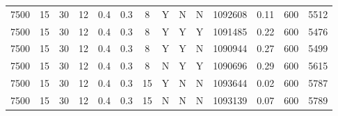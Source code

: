 \documentclass[a4paper, twocolumn, oneside, 10pt]{article}
\begin{document}
\begin{longtable}{|ccccccccccllll|}
	7500 & 15 & 30 & 12 & 0.4 & 0.3 & 8 & Y & N & N & 1092608 & 0.11 & 600 & 5512\\
	7500 & 15 & 30 & 12 & 0.4 & 0.3 & 8 & Y & Y & Y & 1091485 & 0.22 & 600 & 5476\\
	7500 & 15 & 30 & 12 & 0.4 & 0.3 & 8 & Y & Y & N & 1090944 & 0.27 & 600 & 5499\\
	7500 & 15 & 30 & 12 & 0.4 & 0.3 & 8 & N & Y & Y & 1090696 & 0.29 & 600 & 5615\\
	7500 & 15 & 30 & 12 & 0.4 & 0.3 & 15 & Y & N & N & 1093644 & 0.02 & 600 & 5787\\
	7500 & 15 & 30 & 12 & 0.4 & 0.3 & 15 & N & N & N & 1093139 & 0.07 & 600 & 5789\\
	\hline
\end{longtable}
\end{document}
